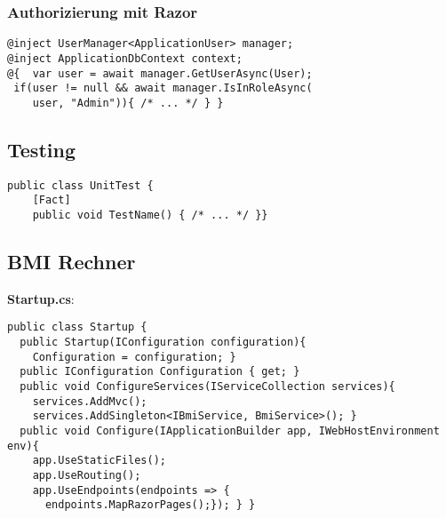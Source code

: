 \subsubsection{Authorizierung mit Razor}
\begin{lstlisting}[style=CSharp]
@inject UserManager<ApplicationUser> manager;
@inject ApplicationDbContext context;
@{  var user = await manager.GetUserAsync(User);
 if(user != null && await manager.IsInRoleAsync(
    user, "Admin")){ /* ... */ } }
\end{lstlisting}

\subsection{Testing}
\begin{lstlisting}[style=CSharp]
public class UnitTest {
    [Fact]
    public void TestName() { /* ... */ }}
\end{lstlisting}
%
%





\subsection{BMI Rechner}
\textbf{Startup.cs}:
\begin{lstlisting}[style=CSharp]
public class Startup {
  public Startup(IConfiguration configuration){
    Configuration = configuration; }
  public IConfiguration Configuration { get; }
  public void ConfigureServices(IServiceCollection services){
    services.AddMvc();
    services.AddSingleton<IBmiService, BmiService>(); }
  public void Configure(IApplicationBuilder app, IWebHostEnvironment env){
    app.UseStaticFiles();
    app.UseRouting();
    app.UseEndpoints(endpoints => {
      endpoints.MapRazorPages();}); } }
\end{lstlisting}

